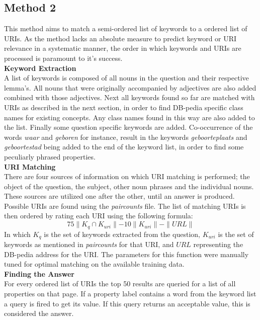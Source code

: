 \documentclass[a4paper,11pt]{article}
\begin{document}
\subsection{Method 2}
This method aims to match a semi-ordered list of keywords to a ordered list of URIs. As the method lacks an absolute measure to predict keyword or URI relevance in a systematic manner, the order in  which keywords and URIs are processed is paramount to it's success.\vspace{3mm}\\
\textbf{Keyword Extraction}\vspace{1mm}\\
A list of keywords is composed of all nouns in the question and their respective lemma's. All nouns that were originally accompanied by adjectives are also added combined with those adjectives. Next all keywords found so far are matched with URIs as described in the next section, in order to find DB-pedia specific class names for existing concepts. Any class names found in this way are also added to the list. Finally some question specific keywords are added. Co-occurrence of the words \textit{waar} and \textit{geboren} for instance, result in the keywords \textit{geboorteplaats} and \textit{geboortestad} being added to the end of the keyword list, in order to find some peculiarly phrased properties.\vspace{3mm}\\
\textbf{URI Matching}\vspace{1mm}\\
There are four sources of information on which URI matching is performed; the object of the question, the subject, other noun phrases and the individual nouns. These sources are utilized one after the other, until an answer is produced. Possible URIs are found using the \textit{paircounts} file. The list of matching URIs is then ordered by rating each URI using the following formula:$$75\parallel K_q \cap K_{uri} \parallel - 10\parallel K_{uri}\parallel - \parallel URL \parallel$$In which $K_q$ is the set of keywords extracted from the question, $K_{uri}$ is the set of keywords as mentioned in \textit{paircounts} for that URI, and $URL$ representing the DB-pedia address for the URI. The parameters for this function were manually tuned for optimal matching on the available training data.\vspace{3mm}\\
\textbf{Finding the Answer}\vspace{1mm}\\
For every ordered list of URIs the top 50 results are queried for a list of all properties on that page. If a property label contains a word from the keyword list a query is fired to get its value. If this query returns an acceptable value, this is considered the answer.
\end{document}
